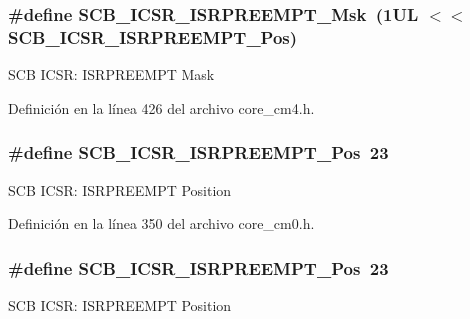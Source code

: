 \subsubsection[{\texorpdfstring{S\+C\+B\+\_\+\+I\+C\+S\+R\+\_\+\+I\+S\+R\+P\+R\+E\+E\+M\+P\+T\+\_\+\+Msk}{SCB_ICSR_ISRPREEMPT_Msk}}]{\setlength{\rightskip}{0pt plus 5cm}\#define S\+C\+B\+\_\+\+I\+C\+S\+R\+\_\+\+I\+S\+R\+P\+R\+E\+E\+M\+P\+T\+\_\+\+Msk~(1\+U\+L $<$$<$ S\+C\+B\+\_\+\+I\+C\+S\+R\+\_\+\+I\+S\+R\+P\+R\+E\+E\+M\+P\+T\+\_\+\+Pos)}\hypertarget{group___c_m_s_i_s___s_c_b_gaa966600396290808d596fe96e92ca2b5}{}\label{group___c_m_s_i_s___s_c_b_gaa966600396290808d596fe96e92ca2b5}
S\+CB I\+C\+SR\+: I\+S\+R\+P\+R\+E\+E\+M\+PT Mask 

Definición en la línea 426 del archivo core\+\_\+cm4.\+h.

\subsubsection[{\texorpdfstring{S\+C\+B\+\_\+\+I\+C\+S\+R\+\_\+\+I\+S\+R\+P\+R\+E\+E\+M\+P\+T\+\_\+\+Pos}{SCB_ICSR_ISRPREEMPT_Pos}}]{\setlength{\rightskip}{0pt plus 5cm}\#define S\+C\+B\+\_\+\+I\+C\+S\+R\+\_\+\+I\+S\+R\+P\+R\+E\+E\+M\+P\+T\+\_\+\+Pos~23}\hypertarget{group___c_m_s_i_s___s_c_b_ga11cb5b1f9ce167b81f31787a77e575df}{}\label{group___c_m_s_i_s___s_c_b_ga11cb5b1f9ce167b81f31787a77e575df}
S\+CB I\+C\+SR\+: I\+S\+R\+P\+R\+E\+E\+M\+PT Position 

Definición en la línea 350 del archivo core\+\_\+cm0.\+h.

\subsubsection[{\texorpdfstring{S\+C\+B\+\_\+\+I\+C\+S\+R\+\_\+\+I\+S\+R\+P\+R\+E\+E\+M\+P\+T\+\_\+\+Pos}{SCB_ICSR_ISRPREEMPT_Pos}}]{\setlength{\rightskip}{0pt plus 5cm}\#define S\+C\+B\+\_\+\+I\+C\+S\+R\+\_\+\+I\+S\+R\+P\+R\+E\+E\+M\+P\+T\+\_\+\+Pos~23}\hypertarget{group___c_m_s_i_s___s_c_b_ga11cb5b1f9ce167b81f31787a77e575df}{}\label{group___c_m_s_i_s___s_c_b_ga11cb5b1f9ce167b81f31787a77e575df}
S\+CB I\+C\+SR\+: I\+S\+R\+P\+R\+E\+E\+M\+PT Position 

